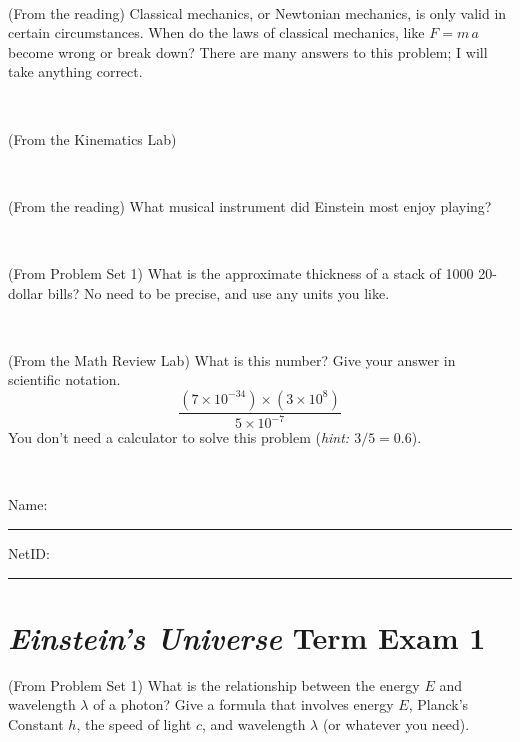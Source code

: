 \documentclass[12pt, letterpaper]{article}
\begin{document}
\vfill ~

\begin{problem} (From the reading)
Classical mechanics, or Newtonian mechanics, is only valid in certain
circumstances. When do the laws of classical mechanics, like $F =
m\,a$ become wrong or break down? There are many answers to this
problem; I will take anything correct.
\end{problem}


\vfill ~


\clearpage


\begin{problem} (From the Kinematics Lab)

\end{problem}


\vfill ~

\begin{problem} (From the reading)
What musical instrument did Einstein most enjoy playing?
\end{problem}


\vfill ~

\begin{problem} (From Problem Set 1)
What is the approximate thickness of a stack of 1000 20-dollar bills?
No need to be precise, and use any units you like.
\end{problem}


\vfill ~

\begin{problem} (From the Math Review Lab)
What is this number? Give your answer in scientific notation.
$$
\frac{(7\times10^{-34})\times(3\times10^8)}{5\times10^{-7}}
$$
You don't need a calculator to solve this problem (\textit{hint: $3/5=0.6$}).
\end{problem}


\vfill ~


\cleardoublepage



\noindent
Name: \rule[-1ex]{0.60\textwidth}{0.1pt}
NetID: \rule[-1ex]{0.20\textwidth}{0.1pt}

\section*{\textsl{Einstein's Universe} Term Exam 1}
\setcounter{problem}{1}


\begin{problem} (From Problem Set 1)
What is the relationship between the energy $E$ and wavelength
$\lambda$ of a photon? Give a formula that involves energy $E$,
Planck's Constant $h$, the speed of light $c$, and wavelength
$\lambda$ (or whatever you need).
\end{problem}
\end{document}
